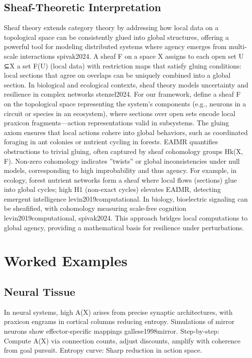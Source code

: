 \documentclass{article}
\begin{document}
\subsection{Sheaf-Theoretic Interpretation}
Sheaf theory extends category theory by addressing how local data on a topological space can be consistently
glued into global structures, offering a powerful tool for modeling distributed systems where agency emerges
from multi-scale interactions {spivak2024}. A sheaf F on a space X assigns to each open set U ⊆X a set F(U)
(local data) with restriction maps that satisfy gluing conditions: local sections that agree on overlaps can
be uniquely combined into a global section.
In biological and ecological contexts, sheaf theory models uncertainty and resilience in complex networks
{stenzel2024}. For our framework, define a sheaf F on the topological space representing the system’s components
(e.g., neurons in a circuit or species in an ecosystem), where sections over open sets encode local praxicon
fragments—action representations valid in subsystems. The gluing axiom ensures that local actions cohere
into global behaviors, such as coordinated foraging in ant colonies or nutrient cycling in forests.
EAIMR quantifies obstructions to trivial gluing, often captured by sheaf cohomology groups Hk(X, F).
Non-zero cohomology indicates ”twists” or global inconsistencies under null models, corresponding to high
improbability and thus agency. For example, in ecology, forest nutrient networks form a sheaf where local
flows (sections) glue into global cycles; high H1 (non-exact cycles) elevates EAIMR, detecting emergent
intelligence {levin2019computational}.
In biology, bioelectric signaling can be sheafified, with cohomology measuring scale-free
cognition {levin2019computational, spivak2024}. This approach bridges local computations to global agency, providing a mathematical basis
for resilience under perturbations.

\section{Worked Examples}
\label{sec:examples}

\subsection{Neural Tissue}
In neural systems, high A(X) arises from precise synaptic architectures, with praxicon engrams in cortical
columns reducing entropy. Simulations of mirror neurons show effector-specific mappings {gallese1998mirror}. Step-by-step:
Compute A(X) via connection counts, adjust discounts, amplify with coherence from goal pursuit. Entropy
curve: Sharp reduction in action space.
\end{document}
